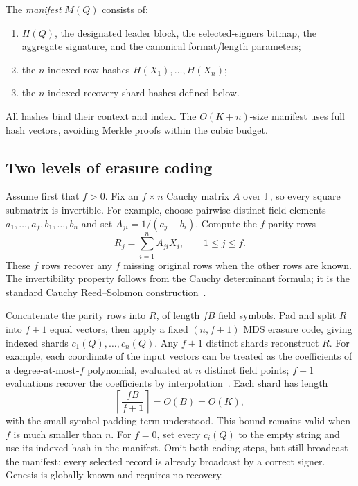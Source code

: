\documentclass[11pt,a4paper]{article}
\theoremstyle{definition}
\newcommand{\FF}{\mathbb{F}}
\begin{document}
The \emph{manifest} \(M(Q)\) consists of:
\begin{enumerate}
\item \(H(Q)\), the designated leader block, the selected-signers bitmap,
  the aggregate signature, and the canonical format/length parameters;
\item the \(n\) indexed row hashes \(H(X_1),\ldots,H(X_n)\);
\item the \(n\) indexed recovery-shard hashes defined below.
\end{enumerate}
All hashes bind their context and index. The \(O(K+n)\)-size manifest uses
full hash vectors, avoiding Merkle proofs within the cubic budget.

\subsection{Two levels of erasure coding}

Assume first that \(f>0\). Fix an \(f\times n\) Cauchy matrix \(A\) over
\(\FF\), so every square submatrix is invertible. For example, choose
pairwise distinct field elements \(a_1,\ldots,a_f,b_1,\ldots,b_n\) and set
\(A_{ji}=1/(a_j-b_i)\). Compute the \(f\) parity rows
\begin{equation}
  R_j=\sum_{i=1}^{n} A_{ji}X_i,\qquad 1\le j\le f.
  \label{eq:inner}
\end{equation}
These \(f\) rows recover any \(f\) missing original rows when the other
rows are known. The invertibility property follows from the Cauchy
determinant formula; it is the standard Cauchy Reed--Solomon
construction~\cite{plank}.

Concatenate the parity rows into \(R\), of length \(fB\) field symbols.
Pad and split \(R\) into \(f+1\) equal vectors, then apply a fixed
\((n,f+1)\) MDS erasure code, giving indexed shards
\(c_1(Q),\ldots,c_n(Q)\). Any \(f+1\) distinct shards reconstruct \(R\).
For example, each coordinate of the input vectors can be treated as the
coefficients of a degree-at-most-\(f\) polynomial, evaluated at \(n\)
distinct field points; \(f+1\) evaluations recover the coefficients by
interpolation~\cite{rao}. Each shard has length
\begin{equation}
  \left\lceil\frac{fB}{f+1}\right\rceil=O(B)=O(K),
  \label{eq:shard}
\end{equation}
with the small symbol-padding term understood. This bound remains valid
when \(f\) is much smaller than \(n\). For \(f=0\), set every \(c_i(Q)\)
to the empty string and use its indexed hash in the manifest. Omit both
coding steps, but still broadcast the manifest: every selected record is
already broadcast by a correct signer. Genesis is globally known and
requires no recovery.
\end{document}
